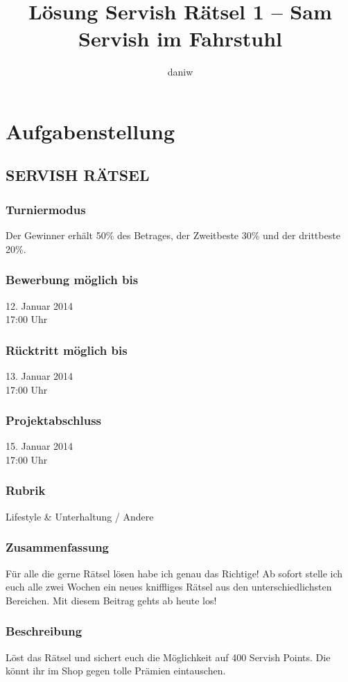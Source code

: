 \documentclass[10pt, fleqn]{article}
\title{Lösung Servish Rätsel 1 -- Sam Servish im Fahrstuhl}
\author{daniw}
\begin{document}
\vfill
\maketitle
\vfill
\tableofcontents
\vfill
\newpage

\section{Aufgabenstellung}
\subsection*{SERVISH RÄTSEL}
\subsubsection*{Turniermodus}
Der Gewinner erhält 50\% des Betrages, der Zweitbeste 30\% und der drittbeste 20\%. 

\subsubsection*{Bewerbung möglich bis}
12. Januar 2014 \\
17:00 Uhr

\subsubsection*{Rücktritt möglich bis}
13. Januar 2014 \\
17:00 Uhr

\subsubsection*{Projektabschluss}
15. Januar 2014 \\
17:00 Uhr

\subsubsection*{Rubrik}
Lifestyle \& Unterhaltung / Andere

\subsubsection*{Zusammenfassung}
Für alle die gerne Rätsel lösen habe ich genau das Richtige! Ab sofort stelle 
ich euch alle zwei Wochen ein neues kniffliges Rätsel aus den 
unterschiedlichsten Bereichen. Mit diesem Beitrag gehts ab heute los!

\subsubsection*{Beschreibung}
Löst das Rätsel und sichert euch die Möglichkeit auf 400 Servish Points. Die 
könnt ihr im Shop gegen tolle Prämien eintauschen.
\end{document}
